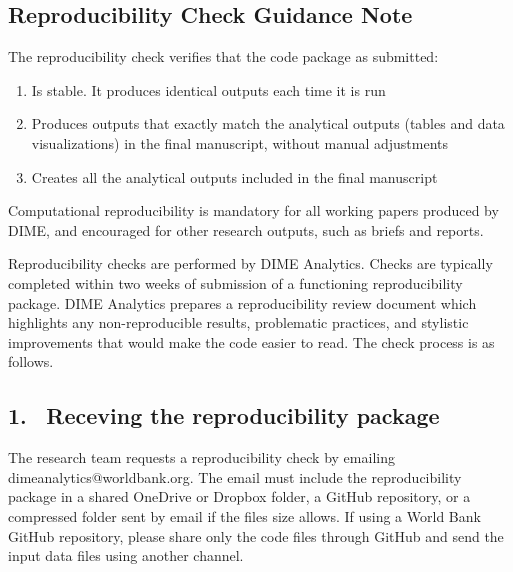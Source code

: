 


	\begin{fullwidth}


	\section*{Reproducibility Check Guidance Note}

The reproducibility check verifies that the code package as submitted:

	\begin{enumerate}
		\setlength\itemsep{-0.1em}
		\item Is stable. It produces identical outputs each time it is run
		\item Produces outputs that exactly match the analytical outputs (tables and data visualizations) in the final manuscript, without manual adjustments
		\item Creates all the analytical outputs included in the final manuscript
	\end{enumerate}

	Computational reproducibility is mandatory for all working papers produced by DIME, and encouraged for other research outputs, such as briefs and reports. 

	Reproducibility checks are performed by DIME Analytics. Checks are typically completed within two weeks of submission of a functioning reproducibility package. DIME Analytics prepares a reproducibility review document which highlights any non-reproducible results, problematic practices, and stylistic improvements that would make the code easier to read. The check process is as follows.

	\subsection{1. \, Receving the reproducibility package}

	The research team requests a reproducibility check by emailing dimeanalytics@worldbank.org. The email must include the reproducibility package in a shared OneDrive or Dropbox folder, a GitHub repository, or a compressed folder sent by email if the files size allows. If using a World Bank GitHub repository, please share only the code files through GitHub and send the input data files using another channel. 
	

\end{fullwidth}
